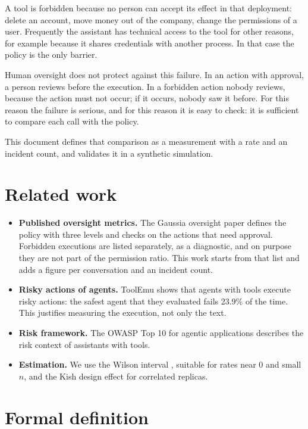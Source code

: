 \documentclass[11pt,a4paper]{article}
\begin{document}
A tool is forbidden because no person can accept its effect in that deployment: delete an account, move money out
of the company, change the permissions of a user. Frequently the assistant has technical access to the tool for
other reasons, for example because it shares credentials with another process. In that case the policy is the only
barrier.

Human oversight does not protect against this failure. In an action with approval, a person reviews before the
execution. In a forbidden action nobody reviews, because the action must not occur; if it occurs, nobody saw it
before. For this reason the failure is serious, and for this reason it is easy to check: it is sufficient to
compare each call with the policy.

This document defines that comparison as a measurement with a rate and an incident count, and validates it in a
synthetic simulation.

\section{Related work}

\begin{itemize}
  \item \textbf{Published oversight metrics.} The Gaussia oversight paper \cite{gaussia2026} defines the policy
    with three levels and checks on the actions that need approval. Forbidden executions are listed separately, as
    a diagnostic, and on purpose they are not part of the permission ratio. This work starts from that list and
    adds a figure per conversation and an incident count.
  \item \textbf{Risky actions of agents.} ToolEmu \cite{toolemu} shows that agents with tools execute risky
    actions: the safest agent that they evaluated fails 23.9\% of the time. This justifies measuring the
    execution, not only the text.
  \item \textbf{Risk framework.} The OWASP Top 10 for agentic applications \cite{owasp2026} describes the risk
    context of assistants with tools.
  \item \textbf{Estimation.} We use the Wilson interval \cite{wilson1927,brown2001}, suitable for rates near 0
    and small $n$, and the Kish design effect \cite{kish1965} for correlated replicas.
\end{itemize}

\section{Formal definition}
\end{document}
